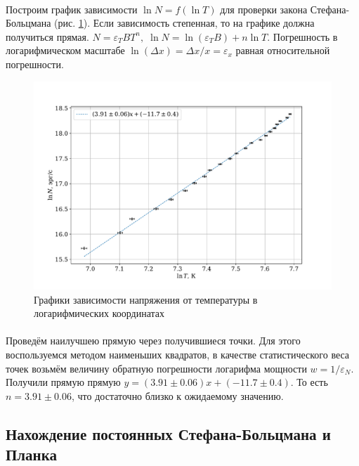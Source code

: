 \documentclass[a4paper,12pt]{article} %
\begin{document}
\paragraph{} Построим график зависимости $\ln N = f(\ln T)$ для проверки закона Стефана-Больцмана (рис. \ref{fig:plot3}). Если зависимость степенная, то на графике должна получиться прямая. $N = \varepsilon_T B T^n, \; \ln N = \ln (\varepsilon_T B) + n \ln T$. Погрешность в логарифмическом масштабе $\ln (\Delta x) = \Delta x / x = \varepsilon_x$ равная относительной погрешности.

\begin{figure}[h]
\centering
\includegraphics[width=\textwidth]{plot3.pdf}
\caption{Графики зависимости напряжения от температуры в логарифмических координатах}
\label{fig:plot3}
\end{figure}

\paragraph{} Проведём наилучшею прямую через получившиеся точки. Для этого воспользуемся методом наименьших квадратов, в качестве статистического веса точек возьмём величину обратную погрешности логарифма мощности $w = 1/\varepsilon_N$. Получили прямую прямую $y = (3.91 \pm 0.06) x + (-11.7 \pm 0.4)$. То есть $n = 3.91 \pm 0.06$, что достаточно близко к ожидаемому значению.

\subsection{Нахождение постоянных Стефана-Больцмана и Планка}
\end{document}
